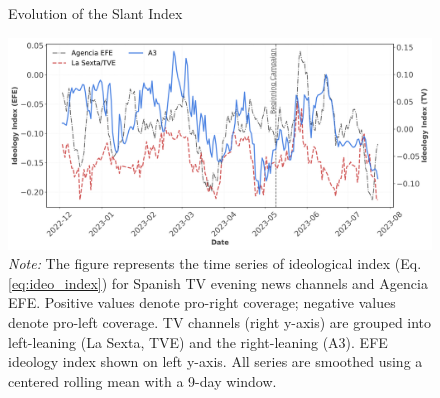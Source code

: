 \documentclass[12pt]{article}
\begin{document}


\begin{figure}[!htb]
	\caption{Evolution of the Slant Index}
	\centering
	\includegraphics[width=150mm]{figures/tv_vs_efe_net_diff}
	\caption*{\small \textit{Note:} The figure represents the time series of ideological index (Eq. \ref{eq:ideo_index}) for Spanish TV evening news channels and Agencia EFE. Positive values denote pro-right coverage; negative values denote pro-left coverage. TV channels (right y-axis) are grouped into left-leaning (La Sexta, TVE) and the right-leaning (A3). EFE ideology index shown on left y-axis. All series are smoothed using a centered rolling mean with a 9-day window.}
	\label{fig:net_tone}
\end{figure}

\end{document}
